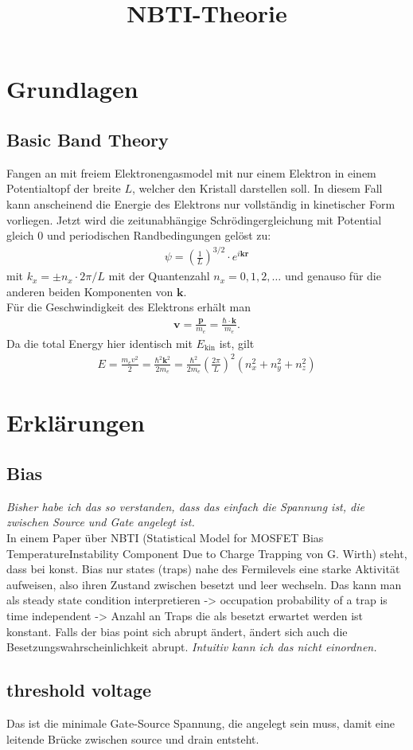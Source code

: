 \documentclass[paper=a4,10pt]{scrartcl}
\begin{document}
\title{NBTI-Theorie}

\section{Grundlagen}
\subsection{Basic Band Theory}
Fangen an mit freiem Elektronengasmodel mit nur einem Elektron in einem Potentialtopf der breite $L$, welcher den Kristall darstellen soll. In diesem Fall kann anscheinend die Energie des Elektrons nur vollständig in kinetischer Form vorliegen. Jetzt wird die zeitunabhängige Schrödingergleichung  mit Potential gleich 0 und periodischen Randbedingungen gelöst zu:
\begin{align}
\psi = \left( \frac{1}{L}	\right)^{3/2} \cdot e^{i  \bm k \bm r}
\end{align}
mit $k_x = \pm n_x \cdot 2\pi / L$ mit der Quantenzahl $n_x=0,1,2,\dots$ und genauso für die anderen beiden Komponenten von $\bm k$.\\
Für die Geschwindigkeit des Elektrons erhält man 
\begin{align}
\bm v = \frac{\bm p}{m_e} = \frac{\hbar \cdot \bm k}{m_e}.
\end{align}
Da die total Energy hier identisch mit $E_{\text{kin}}$ ist, gilt
\begin{align}
E = \frac{m_e v^2}{2} = \frac{\hbar^2 \bm k^2}{2m_e} = \frac{\hbar^2}{2m_e} \left( \frac{2\pi}{L} \right)^2 (n_x^2 +n_y^2 + n_z^2)
\end{align}


\section{Erklärungen}
\subsection{Bias}
\textit{Bisher habe ich das so verstanden, dass das einfach die Spannung ist, die zwischen Source und Gate angelegt ist.} \\

\noindent
In einem Paper über NBTI (Statistical Model for MOSFET Bias TemperatureInstability Component Due to Charge Trapping von G. Wirth) steht, dass bei konst. Bias nur states (traps) nahe des Fermilevels eine starke Aktivität aufweisen, also ihren Zustand zwischen besetzt und leer wechseln. Das kann man als steady state condition interpretieren -> occupation probability of a trap is time independent -> Anzahl an Traps die als besetzt erwartet werden ist konstant. Falls der bias point sich abrupt ändert, ändert sich auch die Besetzungswahrscheinlichkeit abrupt.
\textit{Intuitiv kann ich das nicht einordnen.}

\subsection{threshold voltage}
Das ist die minimale Gate-Source Spannung, die angelegt sein muss, damit eine leitende Brücke zwischen source und drain entsteht.
\end{document}
